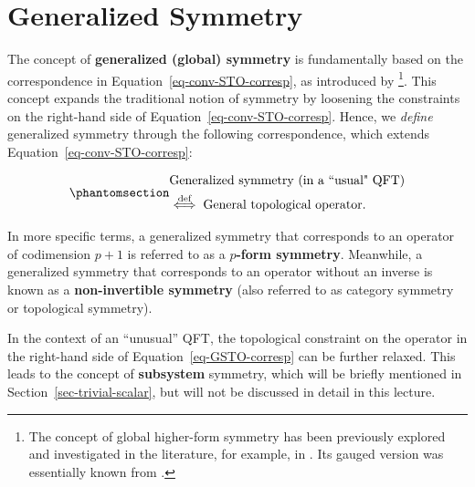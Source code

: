 \documentclass[
  letterpaper,
  DIV=11,
  numbers=noendperiod]{scrreport}
\begin{document}
\section{Generalized Symmetry}\label{generalized-symmetry}

The concept of \textbf{generalized (global) symmetry} is fundamentally
based on the correspondence in Equation~\ref{eq-conv-STO-corresp}, as
introduced by \autocite{Gaiotto:2014kfa} \footnote{The concept of global
  higher-form symmetry has been previously explored and investigated in
  the literature, for example, in
  \autocite{Kapustin:2013uxa,Barkeshli:2014cna}. Its gauged version was
  essentially known from \autocite{KalbRamond}.}. This concept expands
the traditional notion of symmetry by loosening the constraints on the
right-hand side of Equation~\ref{eq-conv-STO-corresp}. Hence, we
\emph{define} generalized symmetry through the following correspondence,
which extends Equation~\ref{eq-conv-STO-corresp}:

\begin{tcolorbox}[enhanced jigsaw, left=2mm, toprule=.15mm, bottomtitle=1mm, titlerule=0mm, leftrule=.75mm, colframe=quarto-callout-important-color-frame, opacitybacktitle=0.6, title=\textcolor{quarto-callout-important-color}{\faExclamation}\hspace{0.5em}{Generalized Symmetry/Topological Operator Correspondence}, bottomrule=.15mm, breakable, arc=.35mm, toptitle=1mm, colbacktitle=quarto-callout-important-color!10!white, rightrule=.15mm, opacityback=0, coltitle=black, colback=white]

\begin{equation}\phantomsection\label{eq-GSTO-corresp}{\begin{split}
&\text{Generalized symmetry (in a ``usual" QFT)} \\ 
&\stackrel{\text{def}}{\Longleftrightarrow}\;
\text{General topological operator.}
\end{split}
}\end{equation}

\end{tcolorbox}

In more specific terms, a generalized symmetry that corresponds to an
operator of codimension \(p+1\) is referred to as a \textbf{\(p\)-form
symmetry}. Meanwhile, a generalized symmetry that corresponds to an
operator without an inverse is known as a \textbf{non-invertible
symmetry} (also referred to as category symmetry or topological
symmetry).

In the context of an ``unusual'' QFT, the topological constraint on the
operator in the right-hand side of Equation~\ref{eq-GSTO-corresp} can be
further relaxed. This leads to the concept of \textbf{subsystem}
symmetry, which will be briefly mentioned in
Section~\ref{sec-trivial-scalar}, but will not be discussed in detail in
this lecture.
\end{document}
